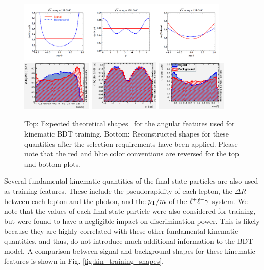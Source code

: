 \begin{figure}[tb]
	\begin{center}
		\includegraphics[width=0.9\textwidth]{fig/MVA/Zg_theorist.png}
		\includegraphics[width=0.3\textwidth]{fig/MVA/cosTheta_reco.png}
		\includegraphics[width=0.3\textwidth]{fig/MVA/phi_reco.png}
		\includegraphics[width=0.3\textwidth]{fig/MVA/costheta_reco.png}
	\end{center}
	\caption[Top: Expected theoretical shapees for the angular features used for kinematic BDT training. Bottom: Reconstructed shapes for these quantities after the \hzg{} selection requirements have been applied. Please note that the red and blue color conventions are reversed for the top and bottom plots.]
	{Top: Expected theoretical shapes~\cite{HZg_angle1} for the angular features used for kinematic BDT training. Bottom: Reconstructed shapes for these quantities after the \hzg{} selection requirements have been applied. Please note that the red and blue color conventions are reversed for the top and bottom plots.} \label{fig:kin_GEN_angles}
\end{figure}

Several fundamental kinematic quantities of the final state particles are also used as training features. These include the pseudorapidity of each lepton, the $\Delta R$ between each lepton and the photon, and the $p_{\mathrm{T}}/m$ of the $\ell^{+}\ell^{-}\gamma$ system. We note that the \pt values of each final state particle were also considered for training, but were found to have a negligible impact on discrimination power. This is likely because they are highly correlated with these other fundamental kinematic quantities, and thus, do not introduce much additional information to the BDT model. A comparison between signal and background shapes for these kinematic features is shown in Fig. \ref{fig:kin_training_shapes}.

